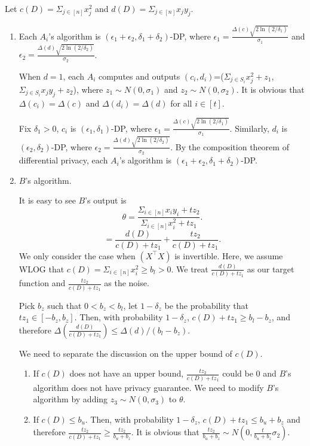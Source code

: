 \documentclass[11pt]{article}
\begin{document}
Let $c(D) = \Sigma_{j \in [n]} { x_{j}^{2} }$ and $d(D)= \Sigma_{j \in [n]} { x_{j}} y_{j} $.
\begin{enumerate}
\item Each $A_{i}$'s algorithm is $(\epsilon_{1}+\epsilon_{2}, \delta_{1}+\delta_{2})$-DP, where $\epsilon_{1} = \frac{\Delta(c) \sqrt{2\ln (2/\delta_{1})}}{\sigma_{1}}$ and $\epsilon_{2} = \frac{\Delta(d) \sqrt{2\ln (2/\delta_{2})}}{\sigma_{2}}$.

When $d=1$, each $A_{i}$ computes and outputs ${(c_{i}, d_{i})}$=($\Sigma_{j \in S_{i}} { x_{j}^{2} }+ z_{1}$, $\Sigma_{j \in S_{i}} { x_{j}} y_{j} + z_{2}$), where $z_{1} \sim N(0, \sigma_{1})$ and $z_{2} \sim N(0, \sigma_{2})$. It is obvious that $\Delta(c_{i})= \Delta(c)$ and $\Delta(d_{i})= \Delta(d)$ for all $i \in [t]$.

Fix $\delta_{1} >0$, $c_{i}$ is $(\epsilon_{1}, \delta_{1})$-DP, where $\epsilon_{1} = \frac{\Delta(c) \sqrt{2\ln (2/\delta_{1})}}{\sigma_{1}}$. Similarly, $d_{i}$ is $(\epsilon_{2}, \delta_{2})$-DP, where $\epsilon_{2} = \frac{\Delta(d) \sqrt{2\ln (2/\delta_{2})}}{\sigma_{2}}$. By the composition theorem of differential privacy, each $A_{i}$'s algorithm is $(\epsilon_{1}+\epsilon_{2}, \delta_{1}+\delta_{2})$-DP.
\item $B$'s algorithm.  

It is easy to see $B$'s output is
\begin{equation}
\theta = \frac{\Sigma_{i\in [n]} x_{i}y_{i} + tz_{2}}{\Sigma_{i\in [n]} x_{i}^{2} + tz_{1}} .
\end{equation}
\begin{equation}
=  \frac{d(D) }{c(D) + tz_{1}} +  \frac{tz_{2}}{c(D) + tz_{1}} .
\end{equation}
We only consider the case when $(X^{\top} X)$ is invertible. Here, we assume WLOG that $c(D) =\Sigma_{i\in [n]} x_{i}^{2}  \geq b_{l} > 0 $. We treat $ \frac{d(D) }{c(D) + tz_{1}}$ as our target function and $ \frac{tz_{2}}{c(D) + tz_{1}}$ as the noise.

Pick $b_{z}$ such that $0<b_{z}<b_{l}$, let $1-\delta_{z}$ be the probability that $tz_{1} \in [-b_{z}, b_{z}]$. Then, with probability $1-\delta_{z}$, $c(D) + tz_{1} \geq b_{l} -b_{z}$, and therefore $\Delta(\frac{d(D) }{c(D) + tz_{1}}) \leq \Delta(d)/(b_{l}-b_{z})$. 

We need to separate the discussion on the upper bound of $c(D)$.
\begin{enumerate}
\item If $c(D)$ does not have an upper bound, $ \frac{tz_{2}}{c(D) + tz_{1}}$ could be $0$ and $B$'s algorithm does not have privacy guarantee. We need to modify $B$'s algorithm by adding $z_{3} \sim N(0, \sigma_{3})$ to $\theta$.
\item If $c(D) \leq b_{u}$. Then, with probability $1-\delta_{z}$, $c(D) + tz_{1} \leq b_{u} + b_{z}$ and therefore $ \frac{tz_{2}}{c(D) + tz_{1}} \geq \frac{tz_{2}}{b_{u} + b_{z}}$. It is obvious that $\frac{tz_{2}}{b_{u} + b_{z}} \sim N(0, \frac{t}{b_{u} + b_{z}} \sigma_{2})$. 


\end{enumerate}
\end{enumerate}
\end{document}
